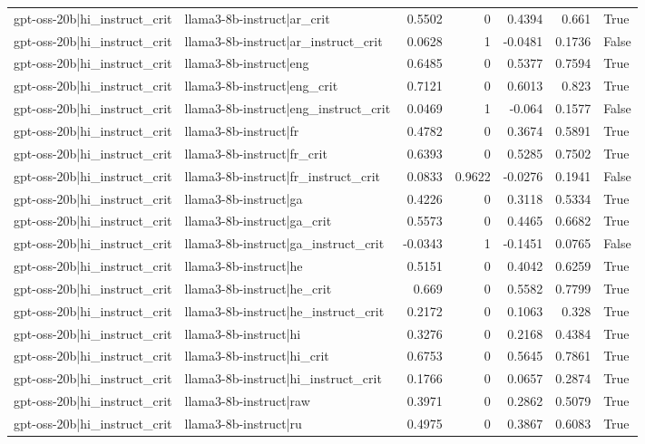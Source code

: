 \begin{table}
\begin{tabular}{l l r r r r l}
gpt-oss-20b|hi_instruct_crit & llama3-8b-instruct|ar_crit & 0.5502 & 0 & 0.4394 & 0.661 & True \\
gpt-oss-20b|hi_instruct_crit & llama3-8b-instruct|ar_instruct_crit & 0.0628 & 1 & -0.0481 & 0.1736 & False \\
gpt-oss-20b|hi_instruct_crit & llama3-8b-instruct|eng & 0.6485 & 0 & 0.5377 & 0.7594 & True \\
gpt-oss-20b|hi_instruct_crit & llama3-8b-instruct|eng_crit & 0.7121 & 0 & 0.6013 & 0.823 & True \\
gpt-oss-20b|hi_instruct_crit & llama3-8b-instruct|eng_instruct_crit & 0.0469 & 1 & -0.064 & 0.1577 & False \\
gpt-oss-20b|hi_instruct_crit & llama3-8b-instruct|fr & 0.4782 & 0 & 0.3674 & 0.5891 & True \\
gpt-oss-20b|hi_instruct_crit & llama3-8b-instruct|fr_crit & 0.6393 & 0 & 0.5285 & 0.7502 & True \\
gpt-oss-20b|hi_instruct_crit & llama3-8b-instruct|fr_instruct_crit & 0.0833 & 0.9622 & -0.0276 & 0.1941 & False \\
gpt-oss-20b|hi_instruct_crit & llama3-8b-instruct|ga & 0.4226 & 0 & 0.3118 & 0.5334 & True \\
gpt-oss-20b|hi_instruct_crit & llama3-8b-instruct|ga_crit & 0.5573 & 0 & 0.4465 & 0.6682 & True \\
gpt-oss-20b|hi_instruct_crit & llama3-8b-instruct|ga_instruct_crit & -0.0343 & 1 & -0.1451 & 0.0765 & False \\
gpt-oss-20b|hi_instruct_crit & llama3-8b-instruct|he & 0.5151 & 0 & 0.4042 & 0.6259 & True \\
gpt-oss-20b|hi_instruct_crit & llama3-8b-instruct|he_crit & 0.669 & 0 & 0.5582 & 0.7799 & True \\
gpt-oss-20b|hi_instruct_crit & llama3-8b-instruct|he_instruct_crit & 0.2172 & 0 & 0.1063 & 0.328 & True \\
gpt-oss-20b|hi_instruct_crit & llama3-8b-instruct|hi & 0.3276 & 0 & 0.2168 & 0.4384 & True \\
gpt-oss-20b|hi_instruct_crit & llama3-8b-instruct|hi_crit & 0.6753 & 0 & 0.5645 & 0.7861 & True \\
gpt-oss-20b|hi_instruct_crit & llama3-8b-instruct|hi_instruct_crit & 0.1766 & 0 & 0.0657 & 0.2874 & True \\
gpt-oss-20b|hi_instruct_crit & llama3-8b-instruct|raw & 0.3971 & 0 & 0.2862 & 0.5079 & True \\
gpt-oss-20b|hi_instruct_crit & llama3-8b-instruct|ru & 0.4975 & 0 & 0.3867 & 0.6083 & True \\

\end{tabular}
\end{table}
